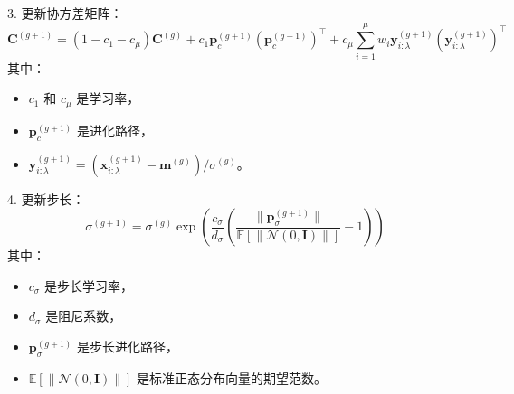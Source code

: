 \documentclass[master]{thesis-uestc}
\begin{document}
3. 更新协方差矩阵：
\begin{equation}
\mathbf{C}^{(g+1)} = (1 - c_1 - c_\mu) \mathbf{C}^{(g)} + c_1 \mathbf{p}_c^{(g+1)} (\mathbf{p}_c^{(g+1)})^\top + c_\mu \sum_{i=1}^{\mu} w_i \mathbf{y}_{i:\lambda}^{(g+1)} (\mathbf{y}_{i:\lambda}^{(g+1)})^\top
\label{eq:covariance_update}
\end{equation}
其中：
\begin{itemize}
    \item \(c_1\) 和 \(c_\mu\) 是学习率，
    \item \(\mathbf{p}_c^{(g+1)}\) 是进化路径，
    \item \(\mathbf{y}_{i:\lambda}^{(g+1)} = (\mathbf{x}_{i:\lambda}^{(g+1)} - \mathbf{m}^{(g)}) / \sigma^{(g)}\)。
\end{itemize}

4. 更新步长：
\begin{equation}
\sigma^{(g+1)} = \sigma^{(g)} \exp\left(\frac{c_\sigma}{d_\sigma} \left(\frac{\|\mathbf{p}_\sigma^{(g+1)}\|}{\mathbb{E}[\|\mathcal{N}(0, \mathbf{I})\|]} - 1\right)\right)
\label{eq:stepsize_update}
\end{equation}
其中：
\begin{itemize}
    \item \(c_\sigma\) 是步长学习率，
    \item \(d_\sigma\) 是阻尼系数，
    \item \(\mathbf{p}_\sigma^{(g+1)}\) 是步长进化路径，
    \item \(\mathbb{E}[\|\mathcal{N}(0, \mathbf{I})\|]\) 是标准正态分布向量的期望范数。
\end{itemize}
\end{document}
